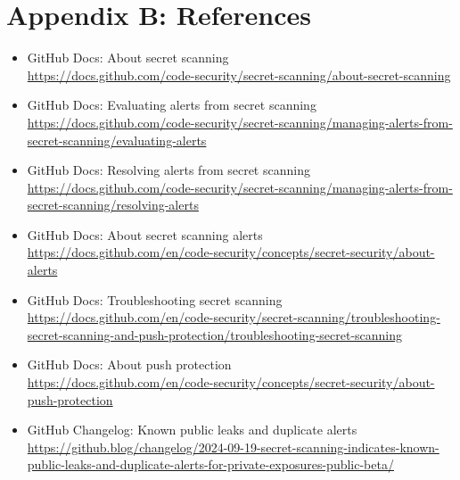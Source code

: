 \documentclass[11pt]{article}
\begin{document}
\section{Appendix B: References}
\begin{itemize}
  \item GitHub Docs: About secret scanning\\
    \href{https://docs.github.com/code-security/secret-scanning/about-secret-scanning}{https://docs.github.com/code-security/secret-scanning/about-secret-scanning}
  \item GitHub Docs: Evaluating alerts from secret scanning\\
    \href{https://docs.github.com/code-security/secret-scanning/managing-alerts-from-secret-scanning/evaluating-alerts}{https://docs.github.com/code-security/secret-scanning/managing-alerts-from-secret-scanning/evaluating-alerts}
  \item GitHub Docs: Resolving alerts from secret scanning\\
    \href{https://docs.github.com/code-security/secret-scanning/managing-alerts-from-secret-scanning/resolving-alerts}{https://docs.github.com/code-security/secret-scanning/managing-alerts-from-secret-scanning/resolving-alerts}
  \item GitHub Docs: About secret scanning alerts\\
    \href{https://docs.github.com/en/code-security/concepts/secret-security/about-alerts}{https://docs.github.com/en/code-security/concepts/secret-security/about-alerts}
  \item GitHub Docs: Troubleshooting secret scanning\\
    \href{https://docs.github.com/en/code-security/secret-scanning/troubleshooting-secret-scanning-and-push-protection/troubleshooting-secret-scanning}{https://docs.github.com/en/code-security/secret-scanning/troubleshooting-secret-scanning-and-push-protection/troubleshooting-secret-scanning}
  \item GitHub Docs: About push protection\\
    \href{https://docs.github.com/en/code-security/concepts/secret-security/about-push-protection}{https://docs.github.com/en/code-security/concepts/secret-security/about-push-protection}
  \item GitHub Changelog: Known public leaks and duplicate alerts\\
    \href{https://github.blog/changelog/2024-09-19-secret-scanning-indicates-known-public-leaks-and-duplicate-alerts-for-private-exposures-public-beta/}{https://github.blog/changelog/2024-09-19-secret-scanning-indicates-known-public-leaks-and-duplicate-alerts-for-private-exposures-public-beta/}

\end{itemize}
\end{document}
